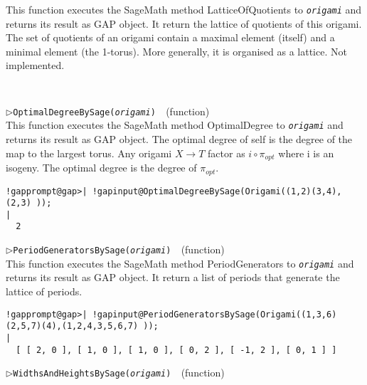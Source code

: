 \documentclass[a4paper,11pt]{report}
\begin{document}
{{{ This function executes the SageMath method LatticeOfQuotients to \mbox{\texttt{\mdseries\slshape origami}} and returns its result as \textsf{GAP} object. It return the lattice of quotients of this origami. The set of
quotients of an origami contain a maximal element (itself) and a minimal
element (the 1-torus). More generally, it is organised as a lattice. Not
implemented. 
\begin{Verbatim}[commandchars=!@|,fontsize=\small,frame=single,label=Example]
  
\end{Verbatim}
 \noindent\textcolor{FuncColor}{$\triangleright$\enspace\texttt{OptimalDegreeBySage({\mdseries\slshape origami})
\label{OptimalDegreeBySage}
}\hfill{\scriptsize (function)}}\\


 This function executes the SageMath method OptimalDegree to \mbox{\texttt{\mdseries\slshape origami}} and returns its result as \textsf{GAP} object. The optimal degree of self is the degree of the map to the largest
torus. Any origami $X \rightarrow T$ factor as $i \circ \pi_{opt}$ where i is an isogeny. The optimal degree is the degree of $\pi_{opt}$. 
\begin{Verbatim}[commandchars=!@|,fontsize=\small,frame=single,label=Example]
  !gapprompt@gap>| !gapinput@OptimalDegreeBySage(Origami((1,2)(3,4), (2,3) ));
|
  2
\end{Verbatim}
 \noindent\textcolor{FuncColor}{$\triangleright$\enspace\texttt{PeriodGeneratorsBySage({\mdseries\slshape origami})
\label{PeriodGeneratorsBySage}
}\hfill{\scriptsize (function)}}\\


 This function executes the SageMath method PeriodGenerators to \mbox{\texttt{\mdseries\slshape origami}} and returns its result as \textsf{GAP} object. It return a list of periods that generate the lattice of periods. 
\begin{Verbatim}[commandchars=!@|,fontsize=\small,frame=single,label=Example]
  !gapprompt@gap>| !gapinput@PeriodGeneratorsBySage(Origami((1,3,6)(2,5,7)(4),(1,2,4,3,5,6,7) ));    
|
  [ [ 2, 0 ], [ 1, 0 ], [ 1, 0 ], [ 0, 2 ], [ -1, 2 ], [ 0, 1 ] ]
\end{Verbatim}
 \noindent\textcolor{FuncColor}{$\triangleright$\enspace\texttt{WidthsAndHeightsBySage({\mdseries\slshape origami})
\label{WidthsAndHeightsBySage}
}\hfill{\scriptsize (function)}}\\


}}}
\end{document}
